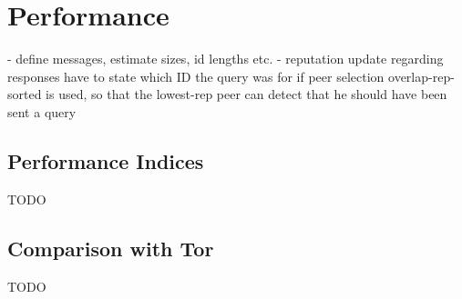 \chapter{Performance}
- define messages, estimate sizes, id lengths etc.
    - reputation update regarding responses have to state which ID the query was
      for if peer selection overlap-rep-sorted is used, so that the lowest-rep
      peer can detect that he should have been sent a query
\section{Performance Indices}
TODO
\section{Comparison with Tor}
TODO
